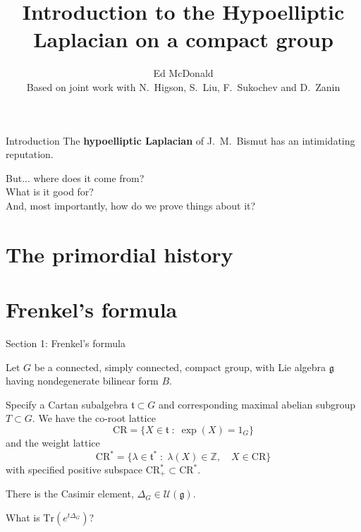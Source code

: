 \documentclass{beamer}
\newcommand\makebeamertitle{\frame{\maketitle}}%
\numberwithin{equation}{section}
\theoremstyle{plain}
\theoremstyle{plain}
\theoremstyle{definition}
\theoremstyle{plain}
\theoremstyle{plain}
\theoremstyle{definition}
\newcommand{\Itgr}{\mathbb{Z}}
\newcommand{\Uc}{\mathcal{U}}
\newcommand{\Tr}{\mathrm{Tr}}
\newcommand{\gf}{\mathfrak{g}}
\newcommand{\tf}{\mathfrak{t}}
\newcommand{\CR}{\mathrm{CR}}
\begin{document}
\title[Introduction to the Hypoelliptic Laplacian]{Introduction to the Hypoelliptic Laplacian on a compact group}


\author[E. McDonald]{Ed McDonald\\
Based on joint work with N.~Higson, S.~Liu, F.~Sukochev and D.~Zanin}



\makebeamertitle

\begin{frame}{Introduction}
  The \textbf{hypoelliptic Laplacian} of J.~M.~Bismut has an intimidating reputation.
  
  \pause
  But... where does it come from?\\
  \pause
  What is it good for?\\
  \pause
  And, most importantly, how do we prove things about it?
\end{frame}

\section{The primordial history}

\section{Frenkel's formula}

\begin{frame}
  \huge{Section 1: Frenkel's formula}
\end{frame}

\begin{frame}
  Let $G$ be a connected, simply connected, compact group, with Lie algebra $\gf$ having nondegenerate bilinear form $B.$
  
  Specify a Cartan subalgebra $\tf \subset G$ and corresponding maximal abelian subgroup $T\subset G.$
  We have the co-root lattice
  \[
    \CR = \{X \in \tf\;:\; \exp(X) = 1_G\}
  \]
  and the weight lattice 
  \[
  \CR^* = \{\lambda \in \tf^*\;:\; \lambda(X) \in \Itgr,\quad X \in \CR\}
  \]
  with specified positive subspace $\CR_+^*\subset \CR^*.$
  
  There is the Casimir element, $\Delta_G \in \Uc(\gf).$
   
  What is $\Tr(e^{t\Delta_G})$? 
\end{frame}
\end{document}
